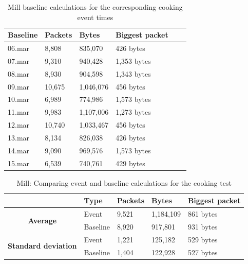 \begin{table}[H]
    \centering
    \caption{Mill baseline calculations for the corresponding cooking event times}
    \begin{tabular}{|l|l|l|l|l|l|}
    \hline
        \textbf{Baseline} & \textbf{Packets} & \textbf{Bytes} & \textbf{Biggest packet} \\ \hline
        06.mar & 8,808  & 835,070   & 426 bytes \\ \hline
        07.mar & 9,310  & 940,428   & 1,353 bytes \\ \hline
        08.mar & 8,930  & 904,598   & 1,343 bytes \\ \hline
        09.mar & 10,675 & 1,046,076 & 456 bytes \\ \hline
        10.mar & 6,989  & 774,986   & 1,573 bytes \\ \hline
        11.mar & 9,983  & 1,107,006 & 1,273 bytes \\ \hline
        12.mar & 10,740 & 1,033,467 & 456 bytes \\ \hline
        13.mar & 8,134  & 826,038   & 426 bytes \\ \hline
        14.mar & 9,090  & 969,576   & 1,573 bytes \\ \hline
        15.mar & 6,539  & 740,761   & 429 bytes \\ \hline
    \end{tabular}
    \label{tab:MillBaselineCookingCalculations}
\end{table}

\begin{table}[H]
    \centering
    \caption{Mill: Comparing event and baseline calculations for the cooking test}
    \begin{tabular}{c|l|l|l|l|}
        \cline{2-5}
        \multicolumn{1}{l|}{}                                              & \textbf{Type} & \textbf{Packets} & \textbf{Bytes} & \textbf{Biggest packet} \\ \hline
        \multicolumn{1}{|c|}{\multirow{2}{*}{\textbf{Average}}}            & Event         & 9,521              & 1,184,109       & 861 bytes               \\ \cline{2-5} 
        \multicolumn{1}{|c|}{}                                             & Baseline      & 8,920              & 917,801         & 931 bytes                \\ \hline
        \multicolumn{1}{|c|}{\multirow{2}{*}{\textbf{Standard deviation}}} & Event         & 1,221              & 125,182         & 529 bytes                 \\ \cline{2-5} 
        \multicolumn{1}{|c|}{}                                             & Baseline      & 1,404               & 122,928       &  527 bytes               \\ \hline          
    \end{tabular}
    \label{tab:MillComparingBaselineAndCookingCalculations}
\end{table}

